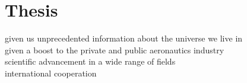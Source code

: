 \documentclass[a4paper,12pt]{article}
\title{}
\author{John Curry\\
        C0409094\\
        History 108\\
        Camosun College\\
        }
\date{\today}
\begin{document}
\maketitle
\nocite{*}
\section*{Thesis}
given us unprecedented information about the universe we live in\\
given a boost to the private and public aeronautics industry\\
scientific advancement in a wide range of fields \\
international cooperation\autocite{woodsbrian}\\
\newpage
\printbibliography
\end{document}
